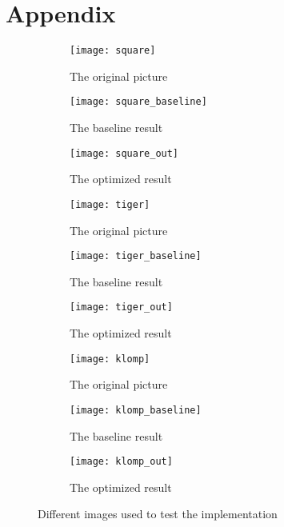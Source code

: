 \section{Appendix}
\begin{figure*}[h!]
    \centering
     \begin{subfigure}[b]{0.3\textwidth}
            \texttt{[image: square]}
            \caption{The original picture}
            \label{fig:app_square}
    \end{subfigure}
    \begin{subfigure}[b]{0.3\textwidth}
            \texttt{[image: square\_baseline]}
            \caption{The baseline result}
            \label{fig:app_square_baseline}
    \end{subfigure}
    \begin{subfigure}[b]{0.3\textwidth}
            \texttt{[image: square\_out]}
            \caption{The optimized result}
            \label{fig:app_square_out}
    \end{subfigure}
   
    \begin{subfigure}[b]{0.3\textwidth}
            \texttt{[image: tiger]}
            \caption{The original picture}
            \label{fig:app_tiger}
    \end{subfigure}
    \begin{subfigure}[b]{0.3\textwidth}
            \texttt{[image: tiger\_baseline]}
            \caption{The baseline result}
            \label{fig:app_tiger_baseline}
    \end{subfigure}
    \begin{subfigure}[b]{0.3\textwidth}
            \texttt{[image: tiger\_out]}
            \caption{The optimized result}
            \label{fig:app_tiger_out}
    \end{subfigure}
  
	\begin{subfigure}[b]{0.3\textwidth}
            \texttt{[image: klomp]}
            \caption{The original picture}
            \label{fig:app_klomp}
    \end{subfigure}
    \begin{subfigure}[b]{0.3\textwidth}
            \texttt{[image: klomp\_baseline]}
            \caption{The baseline result}
            \label{fig:app_klomp_baseline}
    \end{subfigure}
    \begin{subfigure}[b]{0.3\textwidth}
            \texttt{[image: klomp\_out]}
            \caption{The optimized result}
            \label{fig:app_klomp_out}
    \end{subfigure}
    
    \caption{Different images used to test the implementation}
    \label{fig:imgdiff}
\end{figure*}
